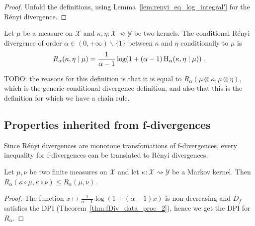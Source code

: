 \begin{proof}\leanok
{}
Unfold the definitions, using Lemma~\ref{lem:renyi_eq_log_integral'} for the Rényi divergence.
\end{proof}

\begin{definition}
  \label{def:condRenyi}
  \leanok
  Let $\mu$ be a measure on $\mathcal X$ and $\kappa, \eta : \mathcal X \rightsquigarrow \mathcal Y$ be two kernels. The conditional Rényi divergence of order $\alpha \in (0,+\infty) \backslash \{1\}$ between $\kappa$ and $\eta$ conditionally to $\mu$ is
  \begin{align*}
  R_\alpha(\kappa, \eta \mid \mu) =\frac{1}{\alpha - 1} \log (1 + (\alpha - 1) \operatorname{H}_\alpha(\kappa, \eta \mid \mu)) \: .
  \end{align*}
\end{definition}

TODO: the reasons for this definition is that it is equal to $R_\alpha(\mu \otimes \kappa, \mu \otimes \eta)$, which is the generic conditional divergence definition, and also that this is the definition for which we have a chain rule.

\subsection{Properties inherited from f-divergences}

Since Rényi divergences are monotone transfomations of f-divergences, every inequality for f-divergences can be translated to Rényi divergences.

\begin{theorem}
  \label{thm:renyi_data_proc}
  \leanok
  Let $\mu, \nu$ be two finite measures on $\mathcal X$ and let $\kappa : \mathcal X \rightsquigarrow \mathcal Y$ be a Markov kernel.
  Then $R_\alpha(\kappa \circ \mu, \kappa \circ \nu) \le R_\alpha(\mu, \nu)$.
\end{theorem}

\begin{proof} \leanok
{}
The function $x \mapsto \frac{1}{\alpha - 1}\log (1 + (\alpha - 1)x)$ is non-decreasing and $D_f$ satisfies the DPI (Theorem~\ref{thm:fDiv_data_proc_2}), hence we get the DPI for $R_\alpha$.
\end{proof}

